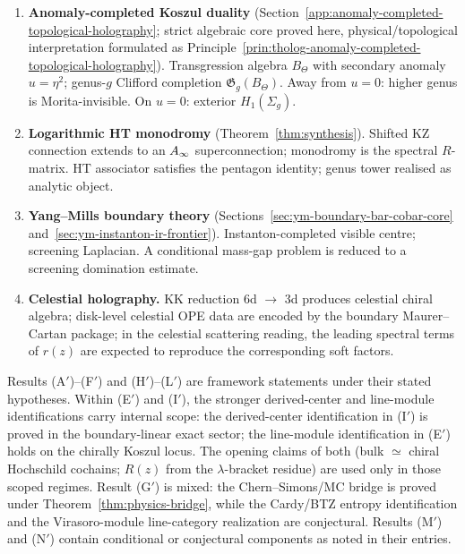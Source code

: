 \begin{enumerate}[label=\textbf{(\Alph*$'$)},leftmargin=2.5em]
\item \textbf{Anomaly-completed Koszul duality}
 (Section~\ref{app:anomaly-completed-topological-holography};
 strict algebraic core proved here, physical/topological
 interpretation formulated as
 Principle~\ref{prin:tholog-anomaly-completed-topological-holography}).
 Transgression algebra $B_\Theta$ with secondary anomaly
 $u = \eta^2$; genus-$g$ Clifford completion
 $\mathfrak{G}_g(B_\Theta)$. Away from $u = 0$: higher genus is
 Morita-invisible. On $u = 0$: exterior $H_1(\Sigma_g)$.

\item \textbf{Logarithmic HT monodromy}
 (Theorem~\ref{thm:synthesis}).
 Shifted KZ connection extends to an $A_\infty$ superconnection;
 monodromy is the spectral $R$-matrix. HT associator satisfies
 the pentagon identity; genus tower realised as analytic object.

\item \textbf{Yang--Mills boundary theory}
 (Sections~\ref{sec:ym-boundary-bar-cobar-core}
 and~\ref{sec:ym-instanton-ir-frontier}).
 Instanton-completed visible centre; screening Laplacian.
 A conditional mass-gap problem is reduced to a screening
 domination estimate.

\item \textbf{Celestial holography.}
 KK reduction $6$d $\to$ $3$d produces celestial chiral algebra;
 disk-level celestial OPE data are encoded by the boundary
 Maurer--Cartan package; in the celestial scattering reading, the
 leading spectral terms of $r(z)$ are expected to reproduce the
 corresponding soft factors.
\end{enumerate}

\noindent
Results (A$'$)--(F$'$) and (H$'$)--(L$'$) are framework statements under their stated hypotheses.
Within (E$'$) and (I$'$), the stronger derived-center and line-module
identifications carry internal scope: the derived-center identification in (I$'$) is proved
in the boundary-linear exact sector; the line-module identification in (E$'$) holds on the
chirally Koszul locus. The opening claims of both (bulk $\simeq$ chiral Hochschild cochains;
$R(z)$ from the $\lambda$-bracket residue) are used only in those scoped regimes.
Result (G$'$) is mixed: the Chern--Simons/MC bridge is proved
under Theorem~\ref{thm:physics-bridge}, while the Cardy/BTZ entropy
identification and the Virasoro-module line-category realization are
conjectural.
Results (M$'$) and (N$'$) contain conditional or conjectural components as noted in their entries.

